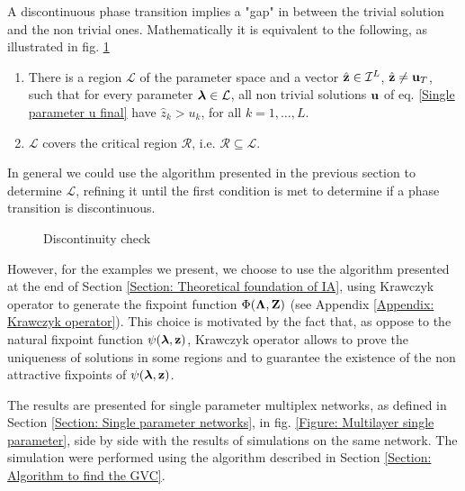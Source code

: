 \documentclass[
11pt, %
english, %
singlespacing, %
nolistspacing, %
liststotoc, %
headsepline, %
]{MastersDoctoralThesis} %
\begin{document}
A discontinuous phase transition implies a "gap" in between the trivial solution and the non trivial ones. Mathematically it is equivalent to the following, as illustrated in fig. \ref{Figure: Discontinuity check}
\begin{enumerate}
	\item There is a region $\mathcal{L}$ of the parameter space and a vector $\hat{\boldsymbol{\mathrm{z}}} \in \mathcal{I}^L$, $\hat{\boldsymbol{\mathrm{z}}} \neq \boldsymbol{\mathrm{u}}_T$, such that for every parameter $\boldsymbol{\mathrm{\lambda}} \in \mathcal{L}$, all non trivial solutions $\boldsymbol{\mathrm{u}}$ of eq. \eqref{Single parameter u final} have $\hat{z}_k > u_k$, for all $k = 1, \dots, L$.
	\item $\mathcal{L}$ covers the critical region $\mathcal{R}$, i.e. $\mathcal{R} \subseteq \mathcal{L}$.
\end{enumerate}
In general we could use the algorithm presented in the previous section to determine $\mathcal{L}$, refining it until the first condition is met to determine if a phase transition is discontinuous.

\begin{figure}
	\missingfigure{}
	\caption{Discontinuity check}
	\label{Figure: Discontinuity check}
\end{figure}

However, for the examples we present, we choose to use the algorithm presented at the end of Section \ref{Section: Theoretical foundation of IA}, using Krawczyk operator to generate the fixpoint function $\Phi(\boldsymbol{\mathrm{\Lambda}}, \boldsymbol{\mathrm{Z}})$ (see Appendix \ref{Appendix: Krawczyk operator}). This choice is motivated by the fact that, as oppose to the natural fixpoint function $\psi(\boldsymbol{\mathrm{\lambda}}, \boldsymbol{\mathrm{z}})$, Krawczyk operator allows to prove the uniqueness of solutions in some regions and to guarantee the existence of the non attractive fixpoints of $\psi(\boldsymbol{\mathrm{\lambda}}, \boldsymbol{\mathrm{z}})$.

The results are presented for single parameter multiplex networks, as defined in Section \ref{Section: Single parameter networks}, in fig. \ref{Figure: Multilayer single parameter}, side by side with the results of simulations on the same network. The simulation were performed using the algorithm described in Section \ref{Section: Algorithm to find the GVC}.
\end{document}
